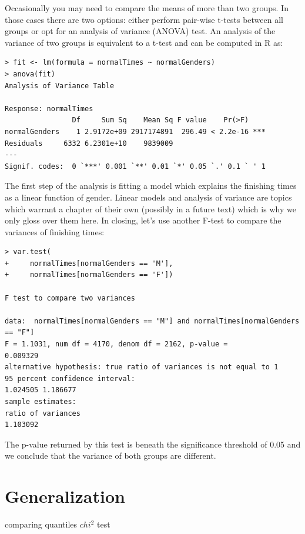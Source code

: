 \documentclass{tufte-book} %
\begin{document}
Occasionally you may need to compare the means of more than two groups. In those cases there are two options: either perform pair-wise t-tests between all groups or opt for an analysis of variance (ANOVA) test. An analysis of the variance of two groups is equivalent to a t-test and can be computed in R as:

\begin{Verbatim}
> fit <- lm(formula = normalTimes ~ normalGenders)
> anova(fit)
Analysis of Variance Table

Response: normalTimes
                Df     Sum Sq    Mean Sq F value    Pr(>F)    
normalGenders    1 2.9172e+09 2917174891  296.49 < 2.2e-16 ***
Residuals     6332 6.2301e+10    9839009                      
---
Signif. codes:  0 `***' 0.001 `**' 0.01 `*' 0.05 `.' 0.1 ` ' 1
\end{Verbatim}

The first step of the analysis is fitting a model which explains the finishing times as a linear function of gender. Linear models and analysis of variance are topics which warrant a chapter of their own (possibly in a future text) which is why we only gloss over them here. In closing, let's use another F-test to compare the variances of finishing times:

\begin{Verbatim}
> var.test(
+     normalTimes[normalGenders == 'M'], 
+     normalTimes[normalGenders == 'F'])

F test to compare two variances

data:  normalTimes[normalGenders == "M"] and normalTimes[normalGenders == "F"]
F = 1.1031, num df = 4170, denom df = 2162, p-value =
0.009329
alternative hypothesis: true ratio of variances is not equal to 1
95 percent confidence interval:
1.024505 1.186677
sample estimates:
ratio of variances 
1.103092 
\end{Verbatim}

The p-value returned by this test is beneath the significance threshold of 0.05 and we conclude that the variance of both groups are different.

\section{Generalization}
comparing quantiles
$chi^2$ test


\backmatter




\printindex %
\end{document}
